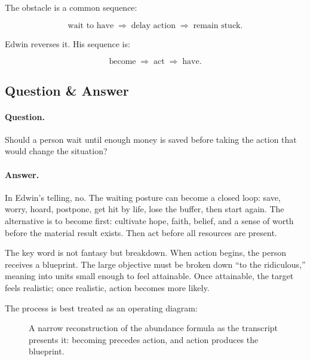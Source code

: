 The obstacle is a common sequence:

\begin{equation}
\text{wait to have}
\;\Longrightarrow\;
\text{delay action}
\;\Longrightarrow\;
\text{remain stuck}.
\end{equation}

Edwin reverses it. His sequence is:

\begin{equation}
\text{become}
\;\Longrightarrow\;
\text{act}
\;\Longrightarrow\;
\text{have}.
\end{equation}

\subsection{Question \& Answer}

\paragraph{Question.}
Should a person wait until enough money is saved before taking the action that would change the situation?

\paragraph{Answer.}
In Edwin's telling, no. The waiting posture can become a closed loop: save, worry, hoard, postpone, get hit by life, lose the buffer, then start again. The alternative is to become first: cultivate hope, faith, belief, and a sense of worth before the material result exists. Then act before all resources are present.

The key word is not fantasy but breakdown. When action begins, the person receives a blueprint. The large objective must be broken down ``to the ridiculous,'' meaning into units small enough to feel attainable. Once attainable, the target feels realistic; once realistic, action becomes more likely.

The process is best treated as an operating diagram:

\begin{figure}
\centering
{}
\caption{A narrow reconstruction of the abundance formula as the transcript presents it: becoming precedes action, and action produces the blueprint.}
\end{figure}

